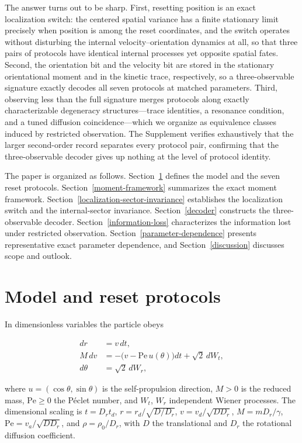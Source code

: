The answer turns out to be sharp. First, resetting position is an exact localization switch: the centered spatial variance has a finite stationary limit precisely when position is among the reset coordinates, and the switch operates without disturbing the internal velocity--orientation dynamics at all, so that three pairs of protocols have identical internal processes yet opposite spatial fates. Second, the orientation bit and the velocity bit are stored in the stationary orientational moment and in the kinetic trace, respectively, so a three-observable signature exactly decodes all seven protocols at matched parameters. Third, observing less than the full signature merges protocols along exactly characterizable degeneracy structures---trace identities, a resonance condition, and a tuned diffusion coincidence---which we organize as equivalence classes induced by restricted observation. The Supplement verifies exhaustively that the larger second-order record separates every protocol pair, confirming that the three-observable decoder gives up nothing at the level of protocol identity.

The paper is organized as follows. Section~\ref{model} defines the model and the seven reset protocols. Section~\ref{moment-framework} summarizes the exact moment framework. Section~\ref{localization-sector-invariance} establishes the localization switch and the internal-sector invariance. Section~\ref{decoder} constructs the three-observable decoder. Section~\ref{information-loss} characterizes the information lost under restricted observation. Section~\ref{parameter-dependence} presents representative exact parameter dependence, and Section~\ref{discussion} discusses scope and outlook.

\section{Model and reset protocols}\label{model}

In dimensionless variables the particle obeys

\[
\begin{aligned}
d r&=v\,dt,\\
M\,dv&=-\bigl(v-\mathrm{Pe}\,u(\theta)\bigr)dt+\sqrt2\,dW_t,\\
d\theta&=\sqrt2\,dW_r,
\end{aligned}
\]

where $u=(\cos\theta,\sin\theta)$ is the self-propulsion direction, $M>0$ is the reduced mass, $\mathrm{Pe}\ge0$ the P\'eclet number, and $W_t$, $W_r$ independent Wiener processes. The dimensional scaling is $t=D_rt_d$, $r=r_d/\sqrt{D/D_r}$, $v=v_d/\sqrt{DD_r}$, $M=mD_r/\gamma$, $\mathrm{Pe}=v_a/\sqrt{DD_r}$, and $\rho=\rho_0/D_r$, with $D$ the translational and $D_r$ the rotational diffusion coefficient.

